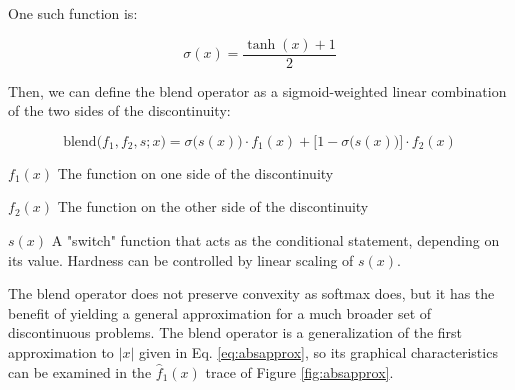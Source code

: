 \noindent
One such function is:

\begin{equation}
    \sigma(x) = \frac{\tanh(x) + 1}{2}
    \label{eq:sigmadef}
\end{equation}

\noindent
Then, we can define the blend operator as a sigmoid-weighted linear combination of the two sides of the discontinuity:

\begin{equation}
    \text{blend}\big(f_1, f_2, s; x \big) = \sigma\big(s(x)\big) \cdot f_1(x) + \Big[1 - \sigma\big(s(x)\big)\Big] \cdot f_2(x)
\end{equation}

\begin{eqexpl}
    \item{$f_1(x)$} The function on one side of the discontinuity
    \item{$f_2(x)$} The function on the other side of the discontinuity
    \item{$s(x)$} A "switch" function that acts as the conditional statement, depending on its value. Hardness can be controlled by linear scaling of $s(x)$.
\end{eqexpl}

The blend operator does not preserve convexity as softmax does, but it has the benefit of yielding a general approximation for a much broader set of discontinuous problems. The blend operator is a generalization of the first approximation to $|x|$ given in Eq. \ref{eq:absapprox}, so its graphical characteristics can be examined in the $\hat{f}_1(x)$ trace of Figure \ref{fig:absapprox}.

